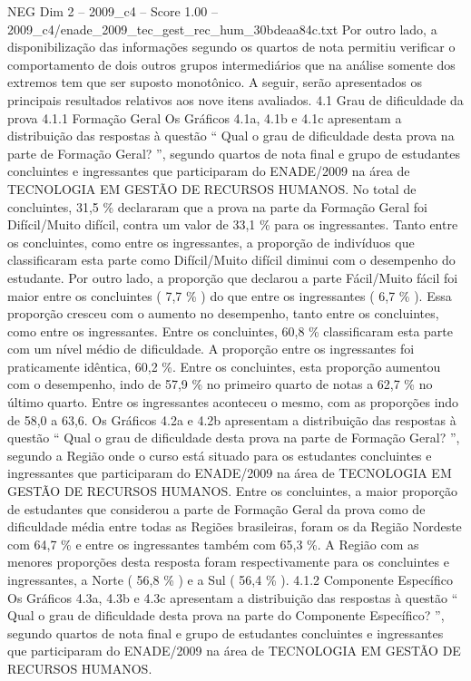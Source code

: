 \begin{textsample}{NEG Dim 2 – 2009\_c4 – Score 1.00 – 2009\_c4/enade\_2009\_tec\_gest\_rec\_hum\_30bdeaa84c.txt}
Por outro lado, a disponibilização das informações segundo os quartos de nota permitiu verificar o comportamento de dois outros grupos intermediários que na análise somente dos extremos tem que ser suposto monotônico.
A seguir, serão apresentados os principais resultados relativos aos nove itens avaliados. 4.1 Grau de dificuldade da prova 4.1.1 Formação Geral Os Gráficos 4.1a, 4.1b e 4.1c apresentam a distribuição das respostas à questão “ Qual o grau de dificuldade desta prova na parte de Formação Geral? ”, segundo quartos de nota final e grupo de estudantes concluintes e ingressantes que participaram do ENADE/2009 na área de TECNOLOGIA EM GESTÃO DE RECURSOS HUMANOS.
No total de concluintes, 31,5 \% declararam que a prova na parte da Formação Geral foi Difícil/Muito difícil, contra um valor de 33,1 \% para os ingressantes.
Tanto entre os concluintes, como entre os ingressantes, a proporção de indivíduos que classificaram esta parte como Difícil/Muito difícil diminui com o desempenho do estudante.
Por outro lado, a proporção que declarou a parte Fácil/Muito fácil foi maior entre os concluintes ( 7,7 \% ) do que entre os ingressantes ( 6,7 \% ).
Essa proporção cresceu com o aumento no desempenho, tanto entre os concluintes, como entre os ingressantes.
Entre os concluintes, 60,8 \% classificaram esta parte com um nível médio de dificuldade.
A proporção entre os ingressantes foi praticamente idêntica, 60,2 \%.
Entre os concluintes, esta proporção aumentou com o desempenho, indo de 57,9 \% no primeiro quarto de notas a 62,7 \% no último quarto.
Entre os ingressantes aconteceu o mesmo, com as proporções indo de 58,0 a 63,6.
Os Gráficos 4.2a e 4.2b apresentam a distribuição das respostas à questão “ Qual o grau de dificuldade desta prova na parte de Formação Geral? ”, segundo a Região onde o curso está situado para os estudantes concluintes e ingressantes que participaram do ENADE/2009 na área de TECNOLOGIA EM GESTÃO DE RECURSOS HUMANOS.
Entre os concluintes, a maior proporção de estudantes que considerou a parte de Formação Geral da prova como de dificuldade média entre todas as Regiões brasileiras, foram os da Região Nordeste com 64,7 \% e entre os ingressantes também com 65,3 \%.
A Região com as menores proporções desta resposta foram respectivamente para os concluintes e ingressantes, a Norte ( 56,8 \% ) e a Sul ( 56,4 \% ). 4.1.2 Componente Específico Os Gráficos 4.3a, 4.3b e 4.3c apresentam a distribuição das respostas à questão “ Qual o grau de dificuldade desta prova na parte do Componente Específico? ”, segundo quartos de nota final e grupo de estudantes concluintes e ingressantes que participaram do ENADE/2009 na área de TECNOLOGIA EM GESTÃO DE RECURSOS HUMANOS.

\end{textsample}
